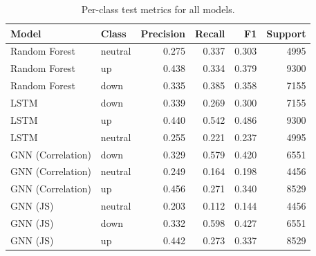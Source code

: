 \begin{table}
\caption{Per-class test metrics for all models.}
\label{tab:test_per_class_metrics}
\begin{tabular}{llrrrr}
\toprule
Model & Class & Precision & Recall & F1 & Support \\
\midrule
Random Forest & neutral & 0.275 & 0.337 & 0.303 & 4995 \\
Random Forest & up & 0.438 & 0.334 & 0.379 & 9300 \\
Random Forest & down & 0.335 & 0.385 & 0.358 & 7155 \\
LSTM & down & 0.339 & 0.269 & 0.300 & 7155 \\
LSTM & up & 0.440 & 0.542 & 0.486 & 9300 \\
LSTM & neutral & 0.255 & 0.221 & 0.237 & 4995 \\
GNN (Correlation) & down & 0.329 & 0.579 & 0.420 & 6551 \\
GNN (Correlation) & neutral & 0.249 & 0.164 & 0.198 & 4456 \\
GNN (Correlation) & up & 0.456 & 0.271 & 0.340 & 8529 \\
GNN (JS) & neutral & 0.203 & 0.112 & 0.144 & 4456 \\
GNN (JS) & down & 0.332 & 0.598 & 0.427 & 6551 \\
GNN (JS) & up & 0.442 & 0.273 & 0.337 & 8529 \\
\bottomrule
\end{tabular}
\end{table}
